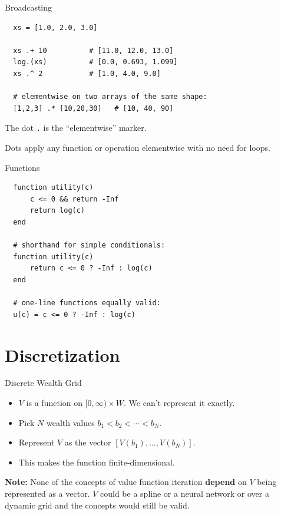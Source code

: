 \documentclass[10pt,aspectratio=169]{beamer}
\begin{document}
\begin{frame}[fragile]{Broadcasting}
  \begin{lstlisting}
  xs = [1.0, 2.0, 3.0]

  xs .+ 10          # [11.0, 12.0, 13.0]
  log.(xs)          # [0.0, 0.693, 1.099]
  xs .^ 2           # [1.0, 4.0, 9.0]

  # elementwise on two arrays of the same shape:
  [1,2,3] .* [10,20,30]   # [10, 40, 90]
  \end{lstlisting}
  The dot \texttt{.} is the ``elementwise'' marker.

  Dots apply any function or operation elementwise with no need for loops.
\end{frame}

\begin{frame}[fragile]{Functions}
  \begin{lstlisting}
  function utility(c)
      c <= 0 && return -Inf
      return log(c)
  end

  # shorthand for simple conditionals:
  function utility(c)
      return c <= 0 ? -Inf : log(c)
  end

  # one-line functions equally valid:
  u(c) = c <= 0 ? -Inf : log(c)
  \end{lstlisting}
\end{frame}

\section{Discretization}

\begin{frame}{Discrete Wealth Grid}
  \begin{itemize}
    \item $V$ is a function on $[0, \infty) \times W$. We can't represent it exactly.
    \item Pick $N$ wealth values $b_1 < b_2 < \cdots < b_N$.
    \item Represent $V$ as the vector $[V(b_1), \ldots, V(b_N)]$.
    \item This makes the function finite-dimensional.
  \end{itemize}
  \textbf{Note:} None of the concepts of value function iteration \textbf{depend} on $V$ being represented as a vector. $V$ could be a spline or a neural network or over a dynamic grid and the concepts would still be valid.
\end{frame}
\end{document}
